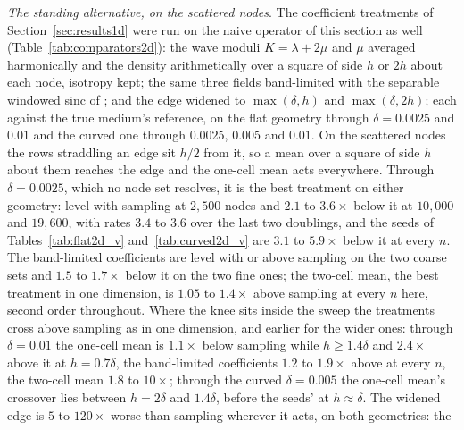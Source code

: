 \documentclass[11pt]{amsart}
\theoremstyle{definition}
\theoremstyle{remark}
\newcommand{\para}[1]{\par\smallskip\noindent\textit{#1}.\enspace}
\begin{document}
\para{The standing alternative, on the scattered nodes}
The coefficient treatments of Section~\ref{sec:results1d} were run on the
naive operator of this section as well (Table~\ref{tab:comparators2d}):
the wave moduli $K = \lambda + 2\mu$ and $\mu$ averaged harmonically and
the density arithmetically over a square of side $h$ or $2h$ about each
node, isotropy kept; the same three fields band-limited with the
separable windowed sinc of \cite{KoeneWittstenRobertsson2022}; and the
edge widened to $\max(\delta, h)$ and $\max(\delta, 2h)$; each against the
true medium's reference, on the flat geometry through $\delta = 0.0025$
and $0.01$ and the curved one through $0.0025$, $0.005$ and $0.01$. On
the scattered nodes the rows straddling an edge sit $h / 2$ from it, so a
mean over a square of side $h$ about them reaches the edge and the
one-cell mean acts everywhere. Through $\delta = 0.0025$, which no node
set resolves, it is the best treatment on either geometry: level with
sampling at $2{,}500$ nodes and $2.1$ to $3.6\times$ below it at
$10{,}000$ and $19{,}600$, with rates $3.4$ to $3.6$ over the last two
doublings, and the seeds of Tables~\ref{tab:flat2d_v}
and~\ref{tab:curved2d_v} are $3.1$ to $5.9\times$ below it at every $n$.
The band-limited coefficients are level with or above sampling on the two
coarse sets and $1.5$ to $1.7\times$ below it on the two fine ones; the
two-cell mean, the best treatment in one dimension, is $1.05$ to
$1.4\times$ above sampling at every $n$ here, second order throughout.
Where the knee sits inside the sweep the treatments cross above sampling
as in one dimension, and earlier for the wider ones: through
$\delta = 0.01$ the one-cell mean is $1.1\times$ below sampling while
$h \ge 1.4\delta$ and $2.4\times$ above it at $h = 0.7\delta$, the
band-limited coefficients $1.2$ to $1.9\times$ above at every $n$, the
two-cell mean $1.8$ to $10\times$; through the curved $\delta = 0.005$
the one-cell mean's crossover lies between $h = 2\delta$ and $1.4\delta$,
before the seeds' at $h \approx \delta$. The widened edge is $5$ to
$120\times$ worse than sampling wherever it acts, on both geometries: the
\end{document}
